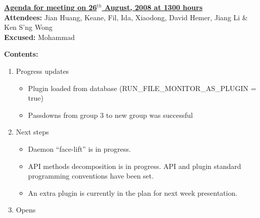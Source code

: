 \documentclass{letter}
\begin{document}
{\large \textbf{\underline{Agenda for meeting on 26$^{th}$ August, 2008 at 1300 hours}}}\\

\textbf{Attendees:} Jian Huang, Keane, Fil, Ida, Xiaodong, David Hemer, Jiang Li \& Ken S'ng Wong \\
\textbf{Excused:} Mohammad

\textbf{Contents:}

\begin{enumerate}
	\item Progress updates
		\begin{itemize}
			\item Plugin loaded from database (RUN\_FILE\_MONITOR\_AS\_PLUGIN = true)
			\item Passdowns from group 3 to new group was successful
		\end{itemize}
	\item Next steps
		\begin{itemize}
			\item Daemon ``face-lift'' is in progress.
			\item API methods decomposition is in progress. API and plugin standard programming conventions have been set. 
			\item An extra plugin is currently in the plan for next week presentation. 
		\end{itemize}
	\item Opens
\end{enumerate}
\end{document}
